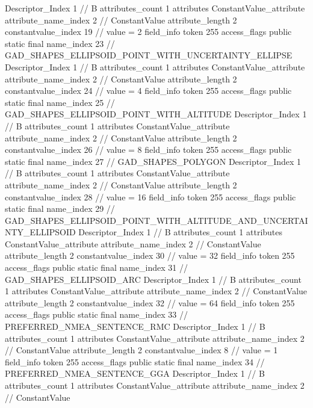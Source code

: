 {{{{{				Descriptor_Index	1		// B
				attributes_count	1
				attributes {
				ConstantValue_attribute {
					attribute_name_index	2		// ConstantValue
					attribute_length	2
					constantvalue_index	19		// value = 2
				}
				}
			}
			field_info {
				token	255
				access_flags	public static final
				name_index	23		// GAD_SHAPES_ELLIPSOID_POINT_WITH_UNCERTAINTY_ELLIPSE
				Descriptor_Index	1		// B
				attributes_count	1
				attributes {
				ConstantValue_attribute {
					attribute_name_index	2		// ConstantValue
					attribute_length	2
					constantvalue_index	24		// value = 4
				}
				}
			}
			field_info {
				token	255
				access_flags	public static final
				name_index	25		// GAD_SHAPES_ELLIPSOID_POINT_WITH_ALTITUDE
				Descriptor_Index	1		// B
				attributes_count	1
				attributes {
				ConstantValue_attribute {
					attribute_name_index	2		// ConstantValue
					attribute_length	2
					constantvalue_index	26		// value = 8
				}
				}
			}
			field_info {
				token	255
				access_flags	public static final
				name_index	27		// GAD_SHAPES_POLYGON
				Descriptor_Index	1		// B
				attributes_count	1
				attributes {
				ConstantValue_attribute {
					attribute_name_index	2		// ConstantValue
					attribute_length	2
					constantvalue_index	28		// value = 16
				}
				}
			}
			field_info {
				token	255
				access_flags	public static final
				name_index	29		// GAD_SHAPES_ELLIPSOID_POINT_WITH_ALTITUDE_AND_UNCERTAINTY_ELLIPSOID
				Descriptor_Index	1		// B
				attributes_count	1
				attributes {
				ConstantValue_attribute {
					attribute_name_index	2		// ConstantValue
					attribute_length	2
					constantvalue_index	30		// value = 32
				}
				}
			}
			field_info {
				token	255
				access_flags	public static final
				name_index	31		// GAD_SHAPES_ELLIPSOID_ARC
				Descriptor_Index	1		// B
				attributes_count	1
				attributes {
				ConstantValue_attribute {
					attribute_name_index	2		// ConstantValue
					attribute_length	2
					constantvalue_index	32		// value = 64
				}
				}
			}
			field_info {
				token	255
				access_flags	public static final
				name_index	33		// PREFERRED_NMEA_SENTENCE_RMC
				Descriptor_Index	1		// B
				attributes_count	1
				attributes {
				ConstantValue_attribute {
					attribute_name_index	2		// ConstantValue
					attribute_length	2
					constantvalue_index	8		// value = 1
				}
				}
			}
			field_info {
				token	255
				access_flags	public static final
				name_index	34		// PREFERRED_NMEA_SENTENCE_GGA
				Descriptor_Index	1		// B
				attributes_count	1
				attributes {
				ConstantValue_attribute {
					attribute_name_index	2		// ConstantValue
}}}}}}}

